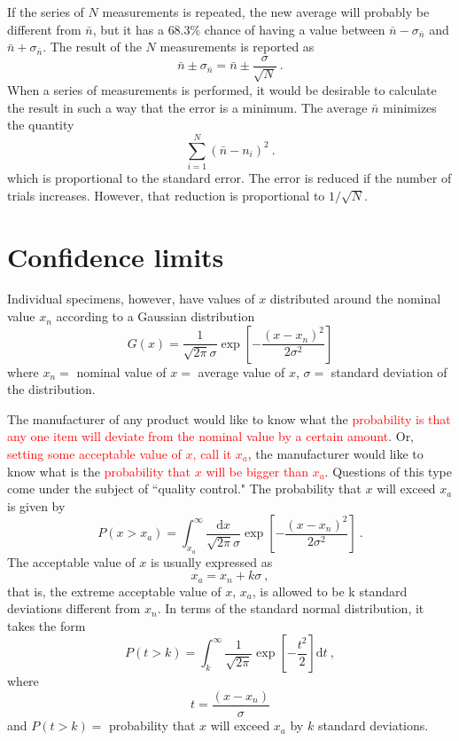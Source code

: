 \documentclass[12pt,a4paper]{article}
\newcommand{\dif}{\mathrm{d}}
\begin{document}
 If the series of $N$ measurements is repeated, the new average will probably be different from $\bar{n}$, but it has a $68.3\%$ chance of having a value between $\bar{n}- \sigma_{\bar{n}}$ and $\bar{n}+ \sigma_{\bar{n}}$. The result of the $N$ measurements is reported as
\begin{equation}
\bar{n}\pm \sigma_{\bar{n}} = \bar{n}\pm \dfrac{ \sigma}{\sqrt{N}} ~.
\end{equation}
When a series of measurements is performed, it would be desirable to calculate the result in such a way that the error is a minimum. The average $\bar{n}$ minimizes the quantity
\begin{equation}
 \sum_{i=1}^N (\bar{n}-n_i)^2 ~.
\end{equation}
which is proportional to the standard error. The error is reduced if the number of trials increases. However, that reduction is proportional to $1/\sqrt{N}$.

 
\section{Confidence limits}

 
Individual specimens, however, have values of $x$ distributed around the nominal value $x_n$ according to a Gaussian distribution
\begin{equation*}
G(x) = \dfrac{1}{\sqrt{2\pi}\sigma} \exp \left[-\dfrac{(x-x_n)^2}{2\sigma^2} \right]
\end{equation*}
where $x_n = $ nominal value of $x = $ average value of $x$, $\sigma =$ standard deviation of the distribution.

The manufacturer of any product  would like to know what the \textcolor{red}{probability is that any one item will deviate from the nominal value by a certain amount}. Or, \textcolor{red}{setting some acceptable value of $x$, call it $x_a$}, the manufacturer would like to know what is the \textcolor{red}{probability that $x$ will be bigger than $x_a$}. Questions of this type come under the subject of ``quality control."  The probability that $x$ will exceed $x_a$ is given by
\begin{equation}
P(x > x_a) = \int_{x_a}^\infty \dfrac{\dif x}{\sqrt{2\pi}\sigma}  \exp \left[-\dfrac{(x-x_n)^2}{2\sigma^2} \right] ~.
\end{equation}
The acceptable value of $x$ is usually expressed as
\begin{equation}
x_a = x_n +k \sigma ~,
\end{equation}
that is, the extreme acceptable value of $x$, $x_a$, is allowed to be k standard deviations different from $x_n$. In terms of the standard normal distribution, it takes the form
\begin{equation}
P(t > k) = \int_k^\infty \dfrac{1}{\sqrt{2\pi}}  \exp \left[-\dfrac{t^2}{2} \right] \dif t ~, 
\end{equation}
where
\begin{equation}
t = \dfrac{(x-x_n)}{\sigma}
\end{equation}
and $P(t > k) = $ probability that $x$ will exceed $x_a$ by $k$ standard deviations.
\end{document}
